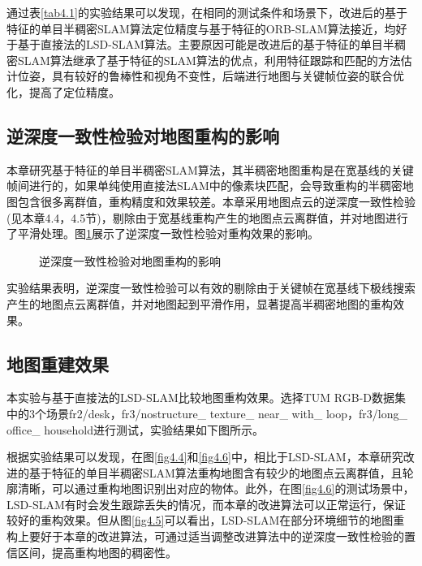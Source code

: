 通过表\ref{tab4.1}的实验结果可以发现，在相同的测试条件和场景下，改进后的基于特征的单目半稠密SLAM算法定位精度与基于特征的ORB-SLAM算法接近，均好于基于直接法的LSD-SLAM算法。主要原因可能是改进后的基于特征的单目半稠密SLAM算法继承了基于特征的SLAM算法的优点，利用特征跟踪和匹配的方法估计位姿，具有较好的鲁棒性和视角不变性，后端进行地图与关键帧位姿的联合优化，提高了定位精度。

\subsection{逆深度一致性检验对地图重构的影响}
本章研究基于特征的单目半稠密SLAM算法，其半稠密地图重构是在宽基线的关键帧间进行的，如果单纯使用直接法SLAM中的像素块匹配，会导致重构的半稠密地图包含很多离群值，重构精度和效果较差。本章采用地图点云的逆深度一致性检验(见本章4.4，4.5节)，剔除由于宽基线重构产生的地图点云离群值，并对地图进行了平滑处理。图\ref{fig4.3}展示了逆深度一致性检验对重构效果的影响。

\begin{figure}[h]
    \centering
     \caption{逆深度一致性检验对地图重构的影响}
\label{fig4.3}
\end{figure}
\vspace{-20pt}

实验结果表明，逆深度一致性检验可以有效的剔除由于关键帧在宽基线下极线搜索产生的地图点云离群值，并对地图起到平滑作用，显著提高半稠密地图的重构效果。

\subsection{地图重建效果}
本实验与基于直接法的LSD-SLAM比较地图重构效果。选择TUM RGB-D数据集中的3个场景fr2/desk，fr3/nostructure\_ texture\_ near\_ with\_ loop，fr3/long\_ office\_ household进行测试，实验结果如下图所示。

根据实验结果可以发现，在图\ref{fig4.4}和\ref{fig4.6}中，相比于LSD-SLAM，本章研究改进的基于特征的单目半稠密SLAM算法重构地图含有较少的地图点云离群值，且轮廓清晰，可以通过重构地图识别出对应的物体。此外，在图\ref{fig4.6}的测试场景中，LSD-SLAM有时会发生跟踪丢失的情况，而本章的改进算法可以正常运行，保证较好的重构效果。但从图\ref{fig4.5}可以看出，LSD-SLAM在部分环境细节的地图重构上要好于本章的改进算法，可通过适当调整改进算法中的逆深度一致性检验的置信区间，提高重构地图的稠密性。


